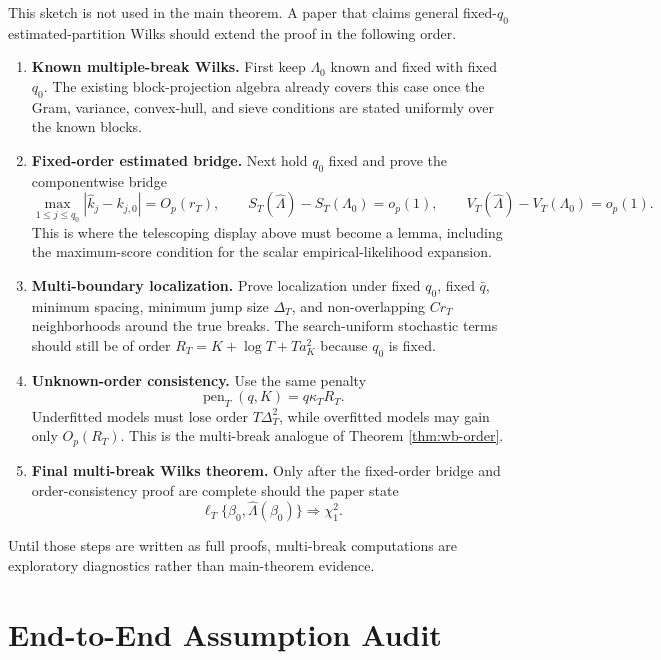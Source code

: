 \documentclass[12pt]{article}
\numberwithin{equation}{section}
\theoremstyle{definition}
\begin{document}
This sketch is not used in the main theorem.  A paper that claims general
fixed-\(q_0\) estimated-partition Wilks should extend the proof in the following
order.
\begin{enumerate}
    \item \textbf{Known multiple-break Wilks.}  First keep \(\Lambda_0\) known
    and fixed with fixed \(q_0\).  The existing block-projection algebra already
    covers this case once the Gram, variance, convex-hull, and sieve conditions
    are stated uniformly over the known blocks.

    \item \textbf{Fixed-order estimated bridge.}  Next hold \(q_0\) fixed and
    prove the componentwise bridge
    \[
        \max_{1\le j\le q_0}|\widehat k_j-k_{j,0}|=O_p(r_T),
        \qquad
        S_T(\widehat\Lambda)-S_T(\Lambda_0)=o_p(1),
        \qquad
        V_T(\widehat\Lambda)-V_T(\Lambda_0)=o_p(1).
    \]
    This is where the telescoping display above must become a lemma, including
    the maximum-score condition for the scalar empirical-likelihood expansion.

    \item \textbf{Multi-boundary localization.}  Prove localization under fixed
    \(q_0\), fixed \(\bar q\), minimum spacing, minimum jump size \(\Delta_T\),
    and non-overlapping \(Cr_T\) neighborhoods around the true breaks.  The
    search-uniform stochastic terms should still be of order
    \(R_T=K+\log T+Ta_K^2\) because \(q_0\) is fixed.

    \item \textbf{Unknown-order consistency.}  Use the same penalty
    \[
        \operatorname{pen}_T(q,K)=q\kappa_T R_T.
    \]
    Underfitted models must lose order \(T\Delta_T^2\), while overfitted models
    may gain only \(O_p(R_T)\).  This is the multi-break analogue of Theorem
    \ref{thm:wb-order}.

    \item \textbf{Final multi-break Wilks theorem.}  Only after the fixed-order
    bridge and order-consistency proof are complete should the paper state
    \[
        \ell_T\{\beta_0,\widehat\Lambda(\beta_0)\}\Rightarrow\chi_1^2.
    \]
\end{enumerate}
Until those steps are written as full proofs, multi-break computations are
exploratory diagnostics rather than main-theorem evidence.
\section{End-to-End Assumption Audit}
\label{sec:bp-end-to-end-audit}
\end{document}
